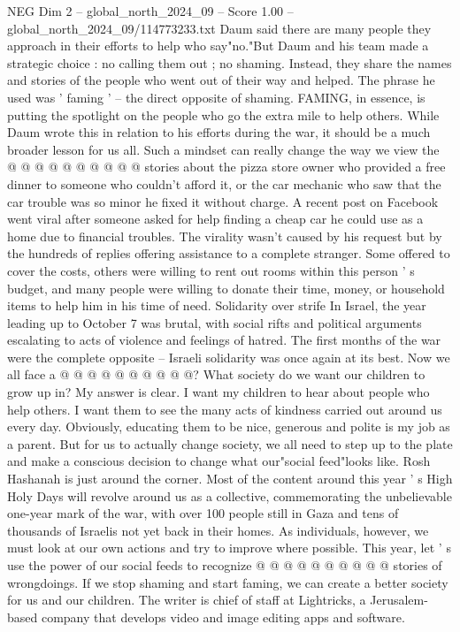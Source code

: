\begin{textsample}{NEG Dim 2 – global\_north\_2024\_09 – Score 1.00 – global\_north\_2024\_09/114773233.txt}
Daum said there are many people they approach in their efforts to help who say"no."But Daum and his team made a strategic choice : no calling them out ; no shaming.
Instead, they share the names and stories of the people who went out of their way and helped.
The phrase he used was ' faming ' -- the direct opposite of shaming.
FAMING, in essence, is putting the spotlight on the people who go the extra mile to help others.
While Daum wrote this in relation to his efforts during the war, it should be a much broader lesson for us all.
Such a mindset can really change the way we view the @ @ @ @ @ @ @ @ @ @ stories about the pizza store owner who provided a free dinner to someone who couldn't afford it, or the car mechanic who saw that the car trouble was so minor he fixed it without charge.
A recent post on Facebook went viral after someone asked for help finding a cheap car he could use as a home due to financial troubles.
The virality wasn't caused by his request but by the hundreds of replies offering assistance to a complete stranger.
Some offered to cover the costs, others were willing to rent out rooms within this person ' s budget, and many people were willing to donate their time, money, or household items to help him in his time of need.
Solidarity over strife In Israel, the year leading up to October 7 was brutal, with social rifts and political arguments escalating to acts of violence and feelings of hatred.
The first months of the war were the complete opposite -- Israeli solidarity was once again at its best.
Now we all face a @ @ @ @ @ @ @ @ @ @?
What society do we want our children to grow up in?
My answer is clear.
I want my children to hear about people who help others.
I want them to see the many acts of kindness carried out around us every day.
Obviously, educating them to be nice, generous and polite is my job as a parent.
But for us to actually change society, we all need to step up to the plate and make a conscious decision to change what our"social feed"looks like.
Rosh Hashanah is just around the corner.
Most of the content around this year ' s High Holy Days will revolve around us as a collective, commemorating the unbelievable one-year mark of the war, with over 100 people still in Gaza and tens of thousands of Israelis not yet back in their homes.
As individuals, however, we must look at our own actions and try to improve where possible.
This year, let ' s use the power of our social feeds to recognize @ @ @ @ @ @ @ @ @ @ stories of wrongdoings.
If we stop shaming and start faming, we can create a better society for us and our children.
The writer is chief of staff at Lightricks, a Jerusalem-based company that develops video and image editing apps and software.

\end{textsample}
